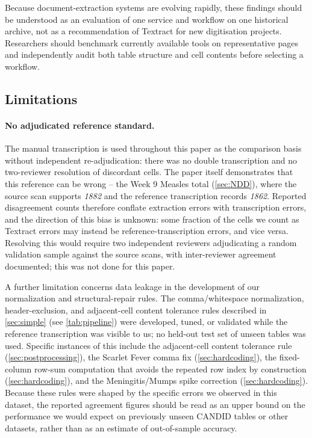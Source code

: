 \documentclass[12pt]{article}
\begin{document}
Because document-extraction systems are evolving rapidly, these findings should be understood as an evaluation of one service and workflow on one historical archive, not as a recommendation of Textract for new digitisation projects. Researchers should benchmark currently available tools on representative pages and independently audit both table structure and cell contents before selecting a workflow.



\subsection{Limitations}\label{sec:limitations}

\paragraph{No adjudicated reference standard.} The manual transcription is used throughout this paper as the comparison basis without independent re-adjudication: there was no double transcription and no two-reviewer resolution of discordant cells. The paper itself demonstrates that this reference can be wrong -- the Week 9 Measles total (\cref{sec:NDD}), where the source scan supports \textit{1882} and the reference transcription records \textit{1862}. Reported disagreement counts therefore conflate extraction errors with transcription errors, and the direction of this bias is unknown: some fraction of the cells we count as Textract errors may instead be reference-transcription errors, and vice versa. Resolving this would require two independent reviewers adjudicating a random validation sample against the source scans, with inter-reviewer agreement documented; this was not done for this paper.

A further limitation concerns data leakage in the development of our normalization and structural-repair rules. The comma/whitespace normalization, header-exclusion, and adjacent-cell content tolerance rules described in \cref{sec:simple} (see \cref{tab:pipeline}) were developed, tuned, or validated while the reference transcription was visible to us; no held-out test set of unseen tables was used. Specific instances of this include the adjacent-cell content tolerance rule (\cref{sec:postprocessing}), the Scarlet Fever comma fix (\cref{sec:hardcoding}), the fixed-column row-sum computation that avoids the repeated row index by construction (\cref{sec:hardcoding}), and the Meningitis/Mumps spike correction (\cref{sec:hardcoding}). Because these rules were shaped by the specific errors we observed in this dataset, the reported agreement figures should be read as an upper bound on the performance we would expect on previously unseen CANDID tables or other datasets, rather than as an estimate of out-of-sample accuracy.
\end{document}
